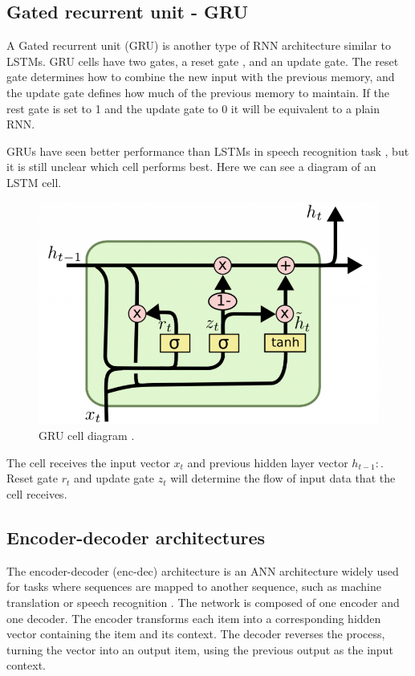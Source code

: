 \documentclass{kththesis}
\begin{document}
\subsection{Gated recurrent unit - GRU}
A Gated recurrent unit (GRU) \cite{gru} is another type of RNN architecture similar to LSTMs. GRU cells have two gates, a reset gate \cite{gru-forget}, and an update gate. The reset gate determines how to combine the new input with the previous memory, and the update gate defines how much of the previous memory to maintain. If the rest gate is set to 1 and the update gate to 0 it will be equivalent to a plain RNN.

GRUs have seen better performance than LSTMs in speech recognition task \cite{gru-speech}, but it is still unclear which cell performs best. Here we can see a diagram of an LSTM cell. 

\begin{figure}[H]
    \centering
    \includegraphics[scale=0.6]{GRU-core.png}
    \caption{GRU cell diagram \cite{daniel}.}
    
\end{figure}

The cell receives the input vector $x_{t}$ and previous hidden layer vector $h_{t-1}:$. Reset gate $r_t$ and update gate $z_t$ will determine the flow of input data that the cell receives.

\subsection{Encoder-decoder architectures}
The encoder-decoder (enc-dec) architecture is an ANN architecture widely used for tasks where sequences are mapped to another sequence, such as machine translation or speech recognition \cite{encoder-decoder}. The network is composed of one encoder and one decoder. The encoder transforms each item into a corresponding hidden vector containing the item and its context. The decoder reverses the process, turning the vector into an output item, using the previous output as the input context.
\end{document}

